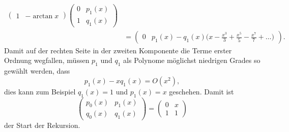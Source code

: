 \begin{refsection}
\begin{align*}
\begin{pmatrix}
1&-\arctan x
\end{pmatrix}
\begin{pmatrix}
0&p_1(x)\\
1&q_1(x)
\end{pmatrix}
\\
&=
\begin{pmatrix}
0
&
p_1(x) - q_1(x)
\biggl(\displaystyle x-\frac{x^3}{3}+\frac{x^5}{5}-\frac{x^7}{7}+\dots\biggr)
\end{pmatrix}.
\end{align*}
Damit auf der rechten Seite in der zweiten Komponente die Terme erster Ordnung
wegfallen, müssen $p_1$ und $q_1$ als Polynome möglichst niedrigen Grades
so gewählt werden, dass
\[
p_1(x)-xq_1(x) = O(x^2),
\]
dies kann zum Beispiel $q_1(x)=1$ und $p_1(x)=x$ geschehen.
Damit ist
\[
\begin{pmatrix}
p_0(x)&p_1(x)\\
q_0(x)&q_1(x)
\end{pmatrix}
=
\begin{pmatrix}
0&x\\
1&1
\end{pmatrix}
\]
der Start der Rekursion.


\end{refsection}
